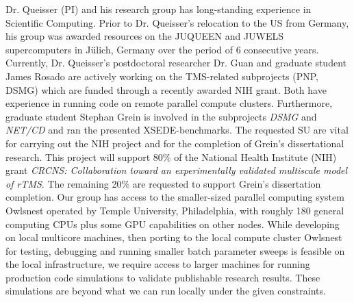 Dr. Queisser (PI) and his research group has long-standing experience in Scientific Computing. Prior to Dr. Queisser's relocation to the US from Germany, his group was awarded resources on the JUQUEEN and JUWELS supercomputers in J\"ulich, Germany over the period of 6 consecutive years. Currently, Dr. Queisser's postdoctoral researcher Dr. Guan and graduate student James Rosado are actively working on the TMS-related subprojects (PNP, DSMG) which are funded through a recently awarded NIH grant. Both have experience in running code on remote parallel compute clusters. Furthermore, graduate student Stephan Grein is involved in the subprojects \emph{DSMG} and \emph{NET/CD} and ran the presented XSEDE-benchmarks. The requested SU are vital for carrying out the NIH project and for the completion of Grein's dissertational research. This project will support 80\% of the National Health Institute (NIH) grant \emph{CRCNS: Collaboration toward an experimentally validated multiscale model of rTMS}. The remaining 20\% are requested to support Grein's dissertation completion. 
Our group has access to the smaller-sized parallel computing system Owlsnest operated by
Temple University, Philadelphia, with roughly 180 general computing CPUs plus some GPU
 capabilities on other nodes. While developing on local multicore machines, then porting to the local compute
cluster Owlsnest for testing, debugging and running smaller batch parameter sweeps is feasible on the local infrastructure, we require access to larger machines for running production code simulations to validate publishable research results. These simulations are beyond what we can run locally under the given constraints. 
